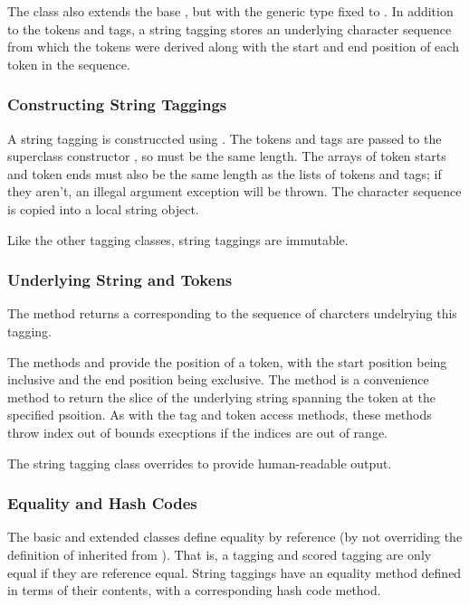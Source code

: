 The class  also extends the base
, but with the generic type  fixed to
.  In addition to the tokens and tags, a string tagging
stores an underlying character sequence from which the tokens were
derived along with the start and end position of each token in the
sequence.  

\subsubsection{Constructing String Taggings}

A string tagging is construccted using
.  The tokens and tags are
passed to the superclass constructor
, so must be the same length.
The arrays of token starts and token ends must also be the same length
as the lists of tokens and tags; if they aren't, an illegal argument
exception will be thrown.  The character sequence is copied into a
local string object.

Like the other tagging classes, string taggings are immutable.

\subsubsection{Underlying String and Tokens}

The method  returns a 
corresponding to the sequence of charcters undelrying this tagging.

The methods  and  provide
the position of a token, with the start position being inclusive and
the end position being exclusive.  The method  is
a convenience method to return the slice of the underlying string
spanning the token at the specified psoition.  As with the tag and
token access methods, these methods throw index out of bounds
execptions if the indices are out of range.

The string tagging class overrides  to provide
human-readable output.


\subsubsection{Equality and Hash Codes}

The basic  and extended  classes
define equality by reference (by not overriding the definition of
 inherited from ).  That
is, a tagging and scored tagging are only equal if they are reference
equal.  String taggings have an equality method defined in terms of their
contents, with a corresponding hash code method.


